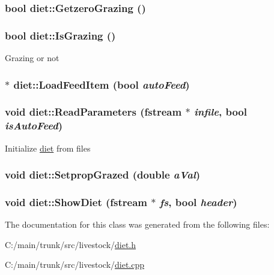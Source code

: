 \label{classdiet_a0d62c160e28ce12200c5bed5eede85f3}
\hypertarget{classdiet_a9a9f6b947cd297e0f800e2116ae17b82}{
\subsubsection[{GetzeroGrazing}]{\setlength{\rightskip}{0pt plus 5cm}bool diet::GetzeroGrazing ()}}
\label{classdiet_a9a9f6b947cd297e0f800e2116ae17b82}
\hypertarget{classdiet_a41b73f38d9233f3c233b697378ebfafd}{
\subsubsection[{IsGrazing}]{\setlength{\rightskip}{0pt plus 5cm}bool diet::IsGrazing ()}}
\label{classdiet_a41b73f38d9233f3c233b697378ebfafd}
Grazing or not \hypertarget{classdiet_a0857655a60f21eb4df63f768f103aee6}{
\subsubsection[{LoadFeedItem}]{ $\ast$ diet::LoadFeedItem (bool {\em autoFeed})}}
\label{classdiet_a0857655a60f21eb4df63f768f103aee6}
\hypertarget{classdiet_ad0f3531dcbf70d82e8af546c17f83cee}{
\subsubsection[{ReadParameters}]{\setlength{\rightskip}{0pt plus 5cm}void diet::ReadParameters (fstream $\ast$ {\em infile}, \/  bool {\em isAutoFeed})}}
\label{classdiet_ad0f3531dcbf70d82e8af546c17f83cee}
Initialize \hyperlink{classdiet}{diet} from files \hypertarget{classdiet_a0abc110d56e3c840390ebee47106edf9}{
\subsubsection[{SetpropGrazed}]{\setlength{\rightskip}{0pt plus 5cm}void diet::SetpropGrazed (double {\em aVal})}}
\label{classdiet_a0abc110d56e3c840390ebee47106edf9}
\hypertarget{classdiet_ae1dd65fbcf12c6f7f2c576896935e293}{
\subsubsection[{ShowDiet}]{\setlength{\rightskip}{0pt plus 5cm}void diet::ShowDiet (fstream $\ast$ {\em fs}, \/  bool {\em header})}}
\label{classdiet_ae1dd65fbcf12c6f7f2c576896935e293}


The documentation for this class was generated from the following files:\begin{DoxyCompactItemize}
\item 
C:/main/trunk/src/livestock/\hyperlink{diet_8h}{diet.h}\item 
C:/main/trunk/src/livestock/\hyperlink{diet_8cpp}{diet.cpp}\end{DoxyCompactItemize}
